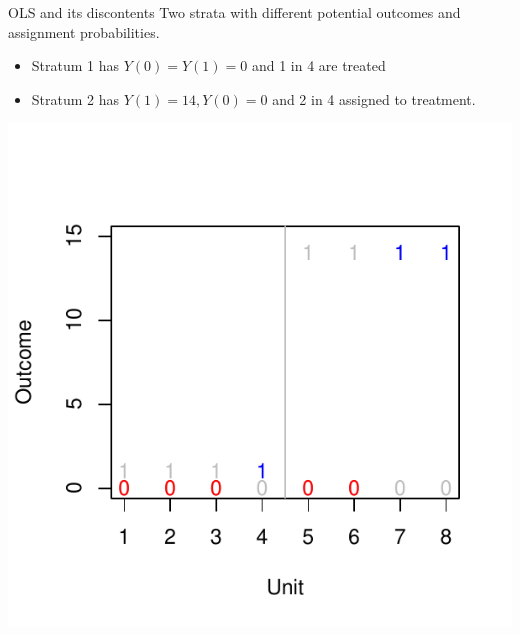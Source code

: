 \documentclass[
  11pt,
  ignorenonframetext,
]{beamer}
\providecommand{\tightlist}{%
  \setlength{\itemsep}{0pt}\setlength{\parskip}{0pt}}\usepackage{longtable,booktabs,array}
\begin{document}
\begin{frame}{OLS and its discontents}
\protect\hypertarget{ols-and-its-discontents}{}
Two strata with different potential outcomes and assignment
probabilities.

\begin{itemize}
\tightlist
\item
  Stratum 1 has \(Y(0)=Y(1)=0\) and 1 in 4 are treated
\item
  Stratum 2 has \(Y(1)=14, Y(0)=0\) and 2 in 4 assigned to treatment.
\end{itemize}

\includegraphics{figs/nools.pdf}
\end{frame}
\end{document}
